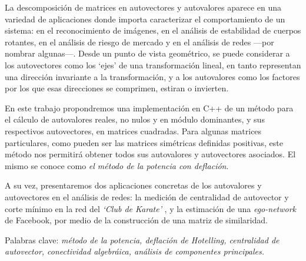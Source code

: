 La descomposición de matrices en autovectores y autovalores aparece en una variedad de aplicaciones donde importa caracterizar el comportamiento de un sistema: en el reconocimiento de imágenes, en el análisis de estabilidad de cuerpos rotantes, en el análisis de riesgo de mercado y en el análisis de redes ---por nombrar algunas---. Desde un punto de vista geométrico, se puede considerar a los autovectores como los `ejes' de una transformación lineal, en tanto representan una dirección invariante a la transformación, y a los autovalores como los factores por los que esas direcciones se comprimen, estiran o invierten. 

\vspace{1em}
En este trabajo propondremos una implementación en C++ de un método para el cálculo de autovalores reales, no nulos y en módulo dominantes, y sus respectivos autovectores, en matrices cuadradas. Para algunas matrices particulares, como pueden ser las matrices simétricas definidas positivas, este método nos permitirá obtener todos sus autovalores y autovectores asociados. El mismo se conoce como \textit{el método de la potencia con deflación}. 

A su vez, presentaremos dos aplicaciones concretas de los autovalores y autovectores en el análisis de redes: la medición de centralidad de autovector y corte mínimo en la red del \textit{`Club de Karate'} \cite{Zachary}, y la estimación de una \textit{ego-network} \cite{Leskovec} de Facebook, por medio de la construcción de una matriz de similaridad.  

\vspace{1em}
\noindent Palabras clave: \textit{método de la potencia, deflación de Hotelling, centralidad de autovector, conectividad algebráica, análisis de componentes principales.}
